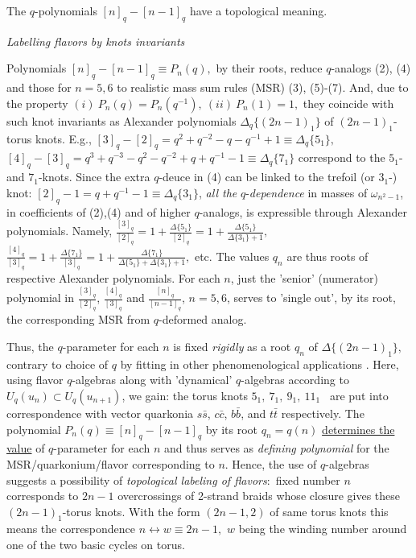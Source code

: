\documentclass[twoside]{article}
\begin{document}
The $q$-polynomials $[n]_q-[n\!-\!1]_q$ have a topological meaning.

\begin{center}
{\it Labelling flavors by knots invariants }
\end{center}

Polynomials $[n]_q\!-\![n\!-\!1]_q\equiv P_n(q),$ by their roots,
reduce $q$-analogs (2), (4) and those for $n{=}5,6$ to realistic
mass sum rules (MSR) (3), (5)-(7). And, due to the property
$(i)\ P_n(q)=P_n(q^{-1}),\ (ii)\ P_n(1)=1,$ they coincide
              \cite{ga-ser,ga-uzh}
with such knot invariants as Alexander polynomials
$\Delta_q\{(2n\!-\!1)_1\}$ of $(2n-1)_1$-torus knots. E.g.,
$[3]_q-[2]_q=q^2+q^{-2}-q-q^{-1}+1\equiv \Delta_q\{ 5_1\} ,$
$[4]_q-[3]_q=q^3+q^{-3}-q^2-q^{-2}+q+q^{-1}-1\equiv \Delta_q\{ 7_1\}$
correspond to the $5_1$- and $7_1$-knots. Since the extra $q$-deuce
in (4) can be linked to the trefoil (or $3_1$-) knot:
$[2]_q -1=q+q^{-1}-1\equiv\Delta_q\{3_1\}$,
{\it all the} $q$-{\it dependence} in masses of $\omega_{n^2-1}$,
in coefficients of (2),(4) and of higher $q$-analogs,
is expressible through Alexander polynomials. Namely,
$
\frac{[3]_q}{[2]_q}=1+\frac{\Delta \{5_1\}}{[2]_q}=
1+\frac{\Delta \{5_1\}}{\Delta \{3_1\} +1},  %
$
$
\frac{[4]_q}{[3]_q}=1+\frac{\Delta \{7_1\}}{[3]_q}=
1+\frac{\Delta \{7_1\}}{\Delta \{5_1\}+\Delta \{3_1\} +1},
$
etc.
The values $q_n$ are thus roots of respective Alexander polynomials.
For each $n$, just the {'senior'} (numerator) polynomial
in $\frac{[3]_q}{[2]_q}$, $\frac{[4]_q}{[3]_q}$ and
$\frac{[n]_q}{[n{-}1]_q}$, $n=5,6$,  serves to 'single out',
by its root, the corresponding MSR from $q$-deformed analog.

Thus, the $q$-parameter for each $n$ is fixed {\it rigidly}
as a root $q_n$ of $\Delta \{ (2n-1)_1\},$ contrary to choice of $q$
by fitting in other phenomenological applications        \cite{iwao}.
Here, using flavor $q$-algebras along with 'dynamical' $q$-algebras
according to $U_q(u_{n})\subset U_q(u_{n+1})$, we gain: the torus knots
$5_1,\ 7_1,\ 9_1,\ 11_1$ \ are put into correspondence \cite{ga-bre,ga-uzh}
with vector quarkonia $s\bar s$, $c\bar c$, $b\bar b$, and $t\bar t$
respectively.  The polynomial $P_{n}(q)\equiv [n]_q-[n\!-\!1]_q$ by its
root $q_n=q(n)$ \underline{determines the value} of $q$-parameter for
each $n$ and thus serves as {\it defining polynomial} for the
MSR/quarkonium/flavor corresponding to $n$.  Hence, the use of
$q$-algebras suggests a possibility of
{\it topological labeling of flavors}:\ fixed number $n$ corresponds
to $2n\!-\!1$ overcrossings of 2-strand braids whose closure gives
these $(2n-1)_1$-torus knots. With the form $(2n\!-\!1,2)$ of same
torus knots this means the correspondence
$n\leftrightarrow w\equiv 2n{-}1,$ $w$ being the winding number
around one of the two basic cycles  on torus.
\end{document}
